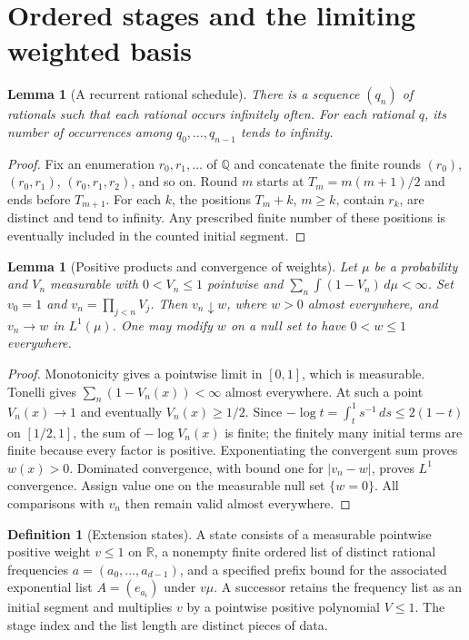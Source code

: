 \documentclass[reqno,a4paper,12pt]{amsart}
\newtheorem{lemma}[theorem]{Lemma}
\theoremstyle{definition}
\newtheorem{definition}[theorem]{Definition}
\newcommand{\R}{\mathbb R}
\newcommand{\Q}{\mathbb Q}
\begin{document}
\section{Ordered stages and the limiting weighted basis}
\begin{lemma}[A recurrent rational schedule]\label{lem:schedule}
There is a sequence $(q_n)$ of rationals such that each rational
occurs infinitely often. For each rational $q$, its number of
occurrences among $q_0,\ldots,q_{n-1}$ tends to infinity.
\end{lemma}
\begin{proof}
Fix an enumeration $r_0,r_1,\ldots$ of $\Q$ and concatenate the finite
rounds $(r_0)$, $(r_0,r_1)$, $(r_0,r_1,r_2)$, and so on.
Round $m$ starts at $T_m=m(m+1)/2$ and ends before $T_{m+1}$.
For each $k$, the positions $T_m+k$, $m\ge k$, contain $r_k$,
are distinct and tend to infinity. Any prescribed finite number of
these positions is eventually included in the counted initial segment.
\end{proof}

\begin{lemma}[Positive products and convergence of weights]
\label{lem:positive-product}
Let $\mu$ be a probability and $V_n$ measurable with $0<V_n\le1$
pointwise and $\sum_n\int(1-V_n)\,d\mu<\infty$.
Set $v_0=1$ and $v_n=\prod_{j<n}V_j$. Then $v_n\downarrow w$,
where $w>0$ almost everywhere, and $v_n\to w$ in $L^1(\mu)$.
One may modify $w$ on a null set to have $0<w\le1$ everywhere.
\end{lemma}
\begin{proof}
Monotonicity gives a pointwise limit in $[0,1]$, which is measurable.
Tonelli gives $\sum_n(1-V_n(x))<\infty$ almost everywhere.
At such a point $V_n(x)\to1$ and eventually $V_n(x)\ge1/2$.
Since $-\log t=\int_t^1s^{-1}\,ds\le2(1-t)$ on $[1/2,1]$,
the sum of $-\log V_n(x)$ is finite; the finitely many initial
terms are finite because every factor is positive.
Exponentiating the convergent sum proves $w(x)>0$.
Dominated convergence, with bound one for $|v_n-w|$, proves $L^1$
convergence. Assign value one on the measurable null set $\{w=0\}$.
All comparisons with $v_n$ then remain valid almost everywhere.
\end{proof}

\begin{definition}[Extension states]\label{def:states}
A state consists of a measurable pointwise positive weight $v\le1$
on $\R$, a nonempty finite ordered list of distinct rational
frequencies $a=(a_0,\ldots,a_{d-1})$, and a specified prefix bound for
the associated exponential list $A=(e_{a_i})$ under $v\mu$.
A successor retains the frequency list as an initial
segment and multiplies $v$ by a pointwise positive polynomial $V\le1$.
The stage index and the list length are distinct pieces of data.
\end{definition}
\end{document}
